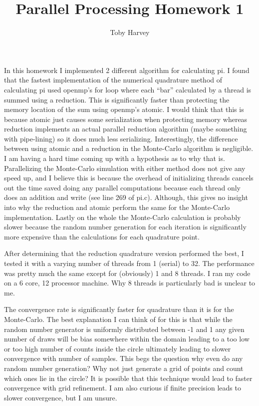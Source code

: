 \documentclass{article}
\begin{document}
\title{Parallel Processing Homework 1}
\author{Toby Harvey}
\maketitle


In this homework I implemented 2 different algorithm for calculating pi. I found that the fastest implementation of the numerical quadrature method of calculating pi used openmp's for loop where each ``bar'' calculated by a thread is summed using a reduction. This is significantly faster than protecting the memory location of the sum using openmp's atomic. I would think that this is because atomic just causes some serialization when protecting memory whereas reduction implements an actual parallel reduction algorithm (maybe something with pipe-lining) so it does much less serializing. Interestingly, the difference between using atomic and a reduction in the Monte-Carlo algorithm is negligible. I am having a hard time coming up with a hypothesis as to why that is. Parallelizing the Monte-Carlo simulation with either method does not give any speed up, and I believe this is because the overhead of initializing threads cancels out the time saved doing any parallel computations because each thread only does an addition and write (see line 269 of pi.c). Although, this gives no insight into why the reduction and atomic perform the same for the Monte-Carlo implementation. Lastly on the whole the Monte-Carlo calculation is probably slower because the random number generation for each iteration is significantly more expensive than the calculations for each quadrature point.

After determining that the reduction quadrature version performed the best, I tested it with a varying number of threads from 1 (serial) to 32. The performance was pretty much the same except for (obviously) 1 and 8 threads. I ran my code on a 6 core, 12 processor machine. Why 8 threads is particularly bad is unclear to me.

The convergence rate is significantly faster for quadrature than it is for the Monte-Carlo. The best explanation I can think of for this is that while the random number generator is uniformly distributed between -1 and 1 any given number of draws will be bias somewhere within the domain leading to a too low or too high number of counts inside the circle ultimately leading to slower convergence with number of samples. This begs the question why even do any random number generation? Why not just generate a grid of points and count which ones lie in the circle? It is possible that this technique would lead to faster convergence with grid refinement. I am also curious if finite precision leads to slower convergence, but I am unsure.
\end{document}
